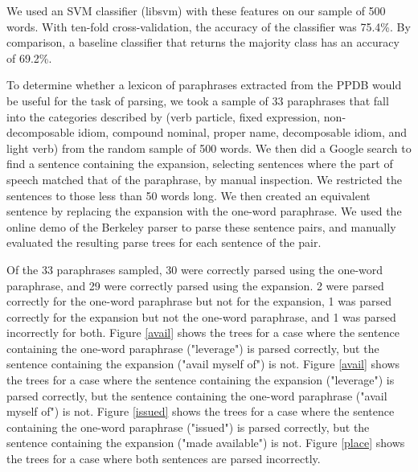 \documentclass[11pt]{article}
\begin{document}
We used an SVM classifier (libsvm) with these features on our sample of 500 words. With ten-fold cross-validation, the accuracy of the classifier was 75.4\%. By comparison, a baseline classifier that returns the majority class has an accuracy of 69.2\%. 

To determine whether a lexicon of paraphrases extracted from the PPDB would be useful for the task of parsing, we took a sample of 33 paraphrases that fall into the categories described by  (verb particle, fixed expression, non-decomposable idiom, compound nominal, proper name, decomposable idiom, and light verb) from the random sample of 500 words. We then did a Google search to find a sentence containing the expansion, selecting sentences where the part of speech matched that of the paraphrase, by manual inspection. We restricted the sentences to those less than 50 words long. We then created an equivalent sentence by replacing the expansion with the one-word paraphrase. We used the online demo of the Berkeley parser \cite{petrov-EtAl:2006:COLACL} to parse these sentence pairs, and manually evaluated the resulting parse trees for each sentence of the pair.

Of the 33 paraphrases sampled, 30 were correctly parsed using the one-word paraphrase, and 29 were correctly parsed using the expansion. 2 were parsed correctly for the one-word paraphrase but not for the expansion, 1 was parsed correctly for the expansion but not the one-word paraphrase, and 1 was parsed incorrectly for both. Figure \ref{avail} shows the trees for a case where the sentence containing the one-word paraphrase ("leverage") is parsed correctly, but the sentence containing the expansion ("avail myself of") is not. Figure \ref{avail} shows the trees for a case where the sentence containing the expansion ("leverage") is parsed correctly, but the sentence containing the one-word paraphrase ("avail myself of") is not. Figure \ref{issued} shows the trees for a case where the sentence containing the one-word paraphrase ("issued") is parsed correctly, but the sentence containing the expansion ("made available") is not. Figure \ref{place} shows the trees for a case where both sentences are parsed incorrectly.
\end{document}
